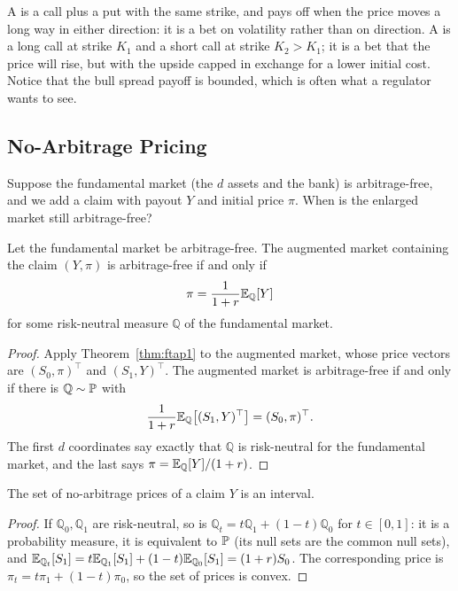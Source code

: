 \documentclass[a4paper]{scrartcl}
\newcommand{\QQ}{\mathbb{Q}}
\begin{document}
A  is a call plus a put with the same strike, and pays off when the price moves a long way in either direction: it is a bet on volatility rather than on direction. A  is a long call at strike $K_1$ and a short call at strike $K_2 > K_1$; it is a bet that the price will rise, but with the upside capped in exchange for a lower initial cost. Notice that the bull spread payoff is bounded, which is often what a regulator wants to see.

\subsection{No-Arbitrage Pricing}

Suppose the fundamental market (the $d$ assets and the bank) is arbitrage-free, and we add a claim with payout $Y$ and initial price $\pi$. When is the enlarged market still arbitrage-free?

\begin{theorem}\label{thm:na-pricing}
	Let the fundamental market be arbitrage-free. The augmented market containing the claim $(Y, \pi)$ is arbitrage-free if and only if
	$$
	\pi = \frac{1}{1+r}\EE_\QQ[Y]
	$$
	for some risk-neutral measure $\QQ$ of the fundamental market.
\end{theorem}

\begin{proof}
	Apply Theorem~\ref{thm:ftap1} to the augmented market, whose price vectors are $(S_0, \pi)^\top$ and $(S_1, Y)^\top$. The augmented market is arbitrage-free if and only if there is $\QQ \sim \PP$ with
	$$
	\frac{1}{1+r}\EE_\QQ\big[(S_1, Y)^\top\big] = (S_0, \pi)^\top.
	$$
	The first $d$ coordinates say exactly that $\QQ$ is risk-neutral for the fundamental market, and the last says $\pi = \EE_\QQ[Y]/(1+r)$.
\end{proof}

\begin{proposition}
	The set of no-arbitrage prices of a claim $Y$ is an interval.
\end{proposition}

\begin{proof}
	If $\QQ_0, \QQ_1$ are risk-neutral, so is $\QQ_t = t\QQ_1 + (1-t)\QQ_0$ for $t \in [0,1]$: it is a probability measure, it is equivalent to $\mathbb{P}$ (its null sets are the common null sets), and $\EE_{\QQ_t}[S_1] = t\EE_{\QQ_1}[S_1] + (1-t)\EE_{\QQ_0}[S_1] = (1+r)S_0$. The corresponding price is $\pi_t = t\pi_1 + (1-t)\pi_0$, so the set of prices is convex.
\end{proof}
\end{document}
